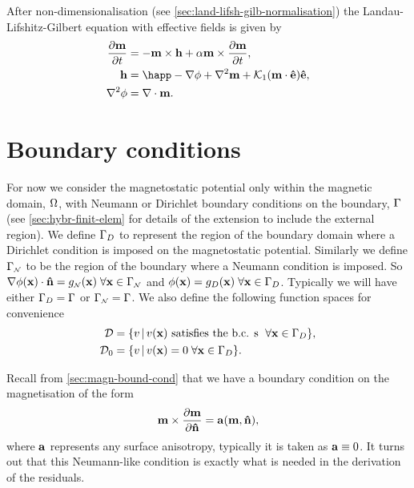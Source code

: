 After non-dimensionalisation (see \autoref{sec:land-lifsh-gilb-normalisation}) the Landau-Lifshitz-Gilbert equation with effective fields is given by
\begin{equation}
  \begin{aligned}
    \dmdt &= - \mv \times \hv + \alpha \mv \times \dmdt, \\
    \hv &= \happ - \nabla \phim + \lap \mv + \kone (\mv \cdot \ev) \ev, \\
    \lap \phim &= \div \mv.
    \label{eqn:ndllg-starting}
  \end{aligned}
\end{equation}

\section{Boundary conditions}
\label{sec:galerkin-bound-cond}

For now we consider the magnetostatic potential only within the magnetic domain, $\Omega$, with Neumann or Dirichlet boundary conditions on the boundary, ${\Gamma}$ (see \autoref{sec:hybr-finit-elem} for details of the extension to include the external region). We define ${\Gamma}_D$ to represent the region of the boundary domain where a Dirichlet condition is imposed on the magnetostatic potential. Similarly we define ${\Gamma}_{\scriptscriptstyle{\mathcal{N}}}$ to be the region of the boundary where a Neumann condition is imposed. So $ \nabla \phi(\mathbf{x}) \cdot \mathbf{\hat{n}} = g_{\scriptscriptstyle{\mathcal{N}}}(\mathbf{x}) \; \forall \mathbf{x} \in {\Gamma}_{\scriptscriptstyle{\mathcal{N}}}$ and $\phi(\mathbf{x}) = g_D(\mathbf{x}) \; \forall \mathbf{x} \in {\Gamma}_D$. Typically we will have either ${\Gamma}_D = {\Gamma}$ or ${\Gamma}_{\scriptscriptstyle{\mathcal{N}}} = {\Gamma}$. We also define the following function spaces for convenience
\begin{align}
  \label{eq:037}
  \mathcal{D} & = \{ v \,|\, v(\mathbf{x}) \text{ satisfies the b.c. s } \; \forall \mathbf{x} \in {\Gamma}_D \}, \\
  \mathcal{D}_0 &= \{ v \,|\, v(\mathbf{x}) = 0 \; \forall \mathbf{x} \in {\Gamma}_D \}.
\end{align}

Recall from \autoref{sec:magn-bound-cond} that we have a boundary condition on the magnetisation of the form
\begin{equation}
  \label{eq:m-bc}
  \mathbf{m} \times \frac{\partial \mathbf{m}}{\partial \mathbf{\hat{n}}} = {\mathbf{a}}(\mathbf{m}, \mathbf{\hat{n}}),
\end{equation}
where ${\mathbf{a}}$ represents any surface anisotropy, typically it is taken as ${\mathbf{a}} \equiv 0$.
It turns out that this Neumann-like condition is exactly what is needed in the derivation of the residuals.


